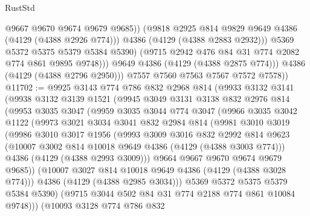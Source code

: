 \begin{lexlean}{RustStd}
\begin{coremodule}
                        @9667
                        @9670
                        @9674
                        @9679
                        @9685))
                    (@9818 @2925 @814 @9829 @9649 @4386 (@4129 (@4388 @2926 @774)))
                    @4386
                    (@4129 (@4388 @2883 @2932)))
                  @5369
                  @5372
                  @5375
                  @5379
                  @5384
                  @5390)
                (@9715 @2942 @476 @84 @31 @774 @2082 @774 @861 @9895 @9748)))
            @9649
            @4386
            (@4129 (@4388 @2875 @774)))
          @4386
          (@4129 (@4388 @2796 @2950)))
        @7557
        @7560
        @7563
        @7567
        @7572
        @7578))
@11702 := @9925
    @3143
    @774
    @786
    @832
    @2968
    @814
    (@9933
      @3132
      @3141
      (@9938
        @3132
        @3139
        @1521
        (@9945
          @3049
          @3131
          @3138
          @832
          @2976
          @814
          (@9953
            @3035
            @3047
            (@9959
              @3035
              @3044
              @774
              @3047
              (@9966
                @3035
                @3042
                @1122
                (@9973
                  @3021
                  @3034
                  @3041
                  @832
                  @2984
                  @814
                  (@9981
                    @3010
                    @3019
                    (@9986
                      @3010
                      @3017
                      @1956
                      (@9993
                        @3009
                        @3016
                        @832
                        @2992
                        @814
                        @9623
                        (@10007 @3002 @814 @10018 @9649 @4386 (@4129 (@4388 @3003 @774)))
                        @4386
                        (@4129 (@4388 @2993 @3009)))
                      @9664
                      @9667
                      @9670
                      @9674
                      @9679
                      @9685))
                  (@10007 @3027 @814 @10018 @9649 @4386 (@4129 (@4388 @3028 @774)))
                  @4386
                  (@4129 (@4388 @2985 @3034)))
                @5369
                @5372
                @5375
                @5379
                @5384
                @5390)
              (@9715 @3044 @502 @84 @31 @774 @2188 @774 @861 @10084 @9748)))
          (@10093
            @3128
            @774
            @786
            @832

\end{coremodule}
\end{lexlean}
